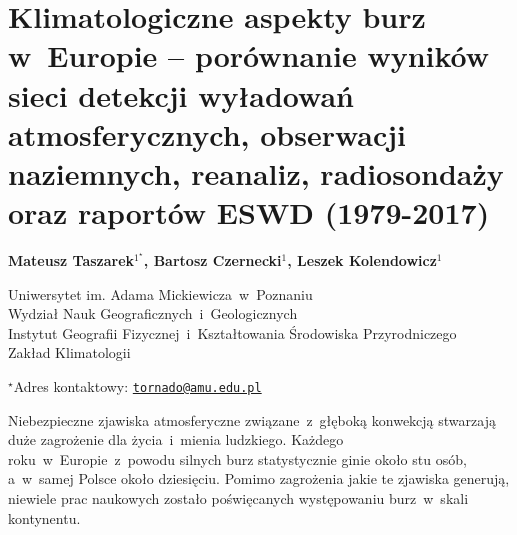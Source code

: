 \documentclass[\main/boa.tex]{subfiles}
\begin{document}
\section{{Klimatologiczne aspekty burz w~Europie -- porównanie wyników sieci detekcji wyładowań atmosferycznych, obserwacji naziemnych, reanaliz, radiosondaży oraz raportów ESWD (1979-2017)}}

\begin{center}
  {\bf {} Mateusz Taszarek$^{1^\star}$,   Bartosz Czernecki$^{1}$,  Leszek Kolendowicz$^{1}$ }
\end{center}

\vskip 0.3cm

\begin{affiliations}
\begin{enumerate}
\begin{minipage}{0.915\textwidth}
\centering
\item Uniwersytet im. Adama Mickiewicza~w~Poznaniu \\ Wydział Nauk Geograficznych~i~Geologicznych  \\ Instytut Geografii Fizycznej~i~Kształtowania Środowiska Przyrodniczego\\
Zakład Klimatologii \\[-2pt]
\end{minipage}
\end{enumerate}
$^\star$Adres kontaktowy: \href{mailto:tornado@amu.edu.pl}{\nolinkurl{tornado@amu.edu.pl}}\\
\end{affiliations}

\vskip 0.5cm


\vskip 0.5cm

Niebezpieczne zjawiska atmosferyczne związane~z~głęboką konwekcją stwarzają duże zagrożenie dla życia~i~mienia ludzkiego. Każdego roku~w~Europie~z~powodu silnych burz statystycznie ginie około stu osób, a~w~samej Polsce około dziesięciu. Pomimo zagrożenia jakie te zjawiska generują, niewiele prac naukowych zostało poświęcanych występowaniu burz~w~skali kontynentu. 
\end{document}
